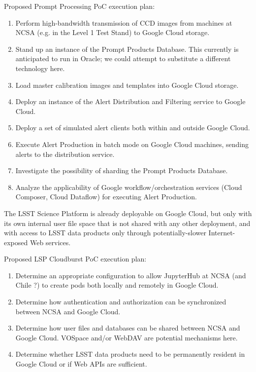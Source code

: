 Proposed Prompt Processing PoC execution plan:
\begin{enumerate}
\item Perform high-bandwidth transmission of CCD images from machines at NCSA (e.g. in the Level 1 Test Stand) to Google Cloud storage.
\item Stand up an instance of the Prompt Products Database.  This currently is anticipated to run in Oracle; we could attempt to substitute a different technology here.
\item Load master calibration images and templates into Google Cloud storage.
\item Deploy an instance of the Alert Distribution and Filtering service to Google Cloud.
\item Deploy a set of simulated alert clients both within and outside Google Cloud.
\item Execute Alert Production in batch mode on Google Cloud machines, sending alerts to the distribution service.
\item Investigate the possibility of sharding the Prompt Products Database.
\item Analyze the applicability of Google workflow/orchestration services (Cloud Composer, Cloud Dataflow) for executing Alert Production.

\end{enumerate}
The LSST Science Platform is already deployable on Google Cloud, but only with its own internal user file space that is not shared with any other deployment, and with access to LSST data products only through potentially-slower Internet-exposed Web services.

Proposed LSP Cloudburst PoC execution plan:
\begin{enumerate}
\item Determine an appropriate configuration to allow JupyterHub at NCSA (and Chile ?) to create pods both locally and remotely in Google Cloud.
\item Determine how authentication and authorization can be synchronized between NCSA and Google Cloud.
\item Determine how user files and databases can be shared between NCSA and Google Cloud.  VOSpace and/or WebDAV are potential mechanisms here.
\item Determine whether LSST data products need to be permanently resident in Google Cloud or if Web APIs are sufficient.

\end{enumerate}


